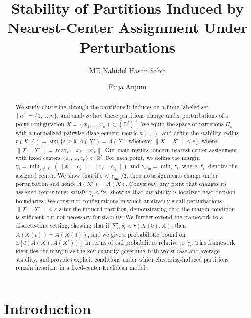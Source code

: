 \documentclass[11pt]{amsart}
\title{Stability of Partitions Induced by Nearest-Center Assignment Under Perturbations}
\author{MD Nahidul Hasan Sabit}
\author{Faija Anjum}
\date{}
\theoremstyle{plain}
\theoremstyle{definition}
\begin{document}
\maketitle

\begin{abstract}
We study clustering through the partitions it induces on a finite labeled set $[n]=\{1,\dots,n\}$, and analyze how these partitions change under perturbations of a point configuration $X=(x_1,\dots,x_n)\in(\mathbb{R}^d)^n$. We equip the space of partitions $\Pi_n$ with a normalized pairwise disagreement metric $d(\cdot,\cdot)$, and define the stability radius $r(X,A)=\sup\{\varepsilon\ge0: A(X')=A(X)\ \text{whenever}\ \|X-X'\|\le\varepsilon\}$, where $\|X-X'\|=\max_i\|x_i-x'_i\|$. Our main results concern nearest-center assignment with fixed centers $\{c_1,\dots,c_k\}\subset\mathbb{R}^d$. For each point, we define the margin $\gamma_i=\min_{j\ne\ell_i}(\|x_i-c_j\|-\|x_i-c_{\ell_i}\|)$ and $\gamma_{\min}=\min_i\gamma_i$, where $\ell_i$ denotes the assigned center. We show that if $\varepsilon<\gamma_{\min}/2$, then no assignments change under perturbation and hence $A(X')=A(X)$. Conversely, any point that changes its assigned center must satisfy $\gamma_i\le2\varepsilon$, showing that instability is localized near decision boundaries. We construct configurations in which arbitrarily small perturbations $\|X-X'\|\le\varepsilon$ alter the induced partition, demonstrating that the margin condition is sufficient but not necessary for stability. We further extend the framework to a discrete-time setting, showing that if $\sum_t \delta_t<r(X(0),A)$, then $A(X(t))=A(X(0))$, and we give a probabilistic bound on $\mathbb{E}[d(A(X),A(X'))]$ in terms of tail probabilities relative to $\gamma_i$. This framework identifies the margin as the key quantity governing both worst-case and average stability, and provides explicit conditions under which clustering-induced partitions remain invariant in a fixed-center Euclidean model.
\end{abstract}

\section{Introduction}
\end{document}
